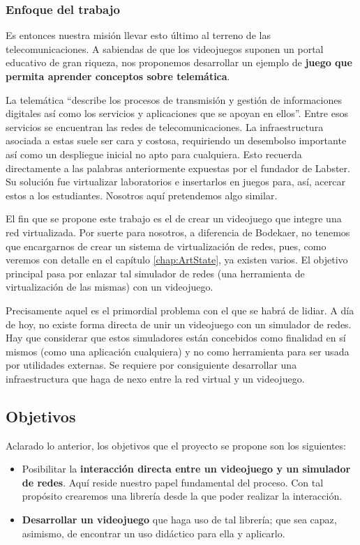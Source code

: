 \subsubsection{Enfoque del trabajo}
Es entonces nuestra misión llevar esto último al terreno de las telecomunicaciones. A sabiendas de que los videojuegos suponen un portal educativo de gran riqueza, nos proponemos desarrollar un ejemplo de \textbf{juego que permita aprender conceptos sobre telemática}.

La telemática ``describe los procesos de transmisión y gestión de informaciones digitales así como los servicios y aplicaciones que se apoyan en ellos''\cite{telematica}. Entre esos servicios se encuentran las redes de telecomunicaciones. La infraestructura asociada a estas suele ser cara y costosa, requiriendo un desembolso importante así como un despliegue inicial no apto para cualquiera. Esto recuerda directamente a las palabras anteriormente expuestas por el fundador de Labster. Su solución fue virtualizar laboratorios e insertarlos en juegos para, así, acercar estos a los estudiantes. Nosotros aquí pretendemos algo similar.

El fin que se propone este trabajo es el de crear un videojuego que integre una red virtualizada. Por suerte para nosotros, a diferencia de Bodekaer, no tenemos que encargarnos de crear un sistema de virtualización de redes, pues, como veremos con detalle en el capítulo \ref{chap:ArtState}, ya existen varios. El objetivo principal pasa por enlazar tal simulador de redes (una herramienta de virtualización de las mismas) con un videojuego.

Precisamente aquel es el primordial problema con el que se habrá de lidiar. A día de hoy, no existe forma directa de unir un videojuego con un simulador de redes. Hay que considerar que estos simuladores están concebidos como finalidad en sí mismos (como una aplicación cualquiera) y no como herramienta para ser usada por utilidades externas. Se requiere por consiguiente desarrollar una infraestructura que haga de nexo entre la red virtual y un videojuego.
 
\subsection{Objetivos}
Aclarado lo anterior, los objetivos que el proyecto se propone son los siguientes:
\begin{itemize}
\item Posibilitar la \textbf{interacción directa entre un videojuego y un simulador de redes}. Aquí reside nuestro papel fundamental del proceso. Con tal propósito crearemos una librería desde la que poder realizar la interacción.
\item \textbf{Desarrollar un videojuego} que haga uso de tal librería; que sea capaz, asimismo, de encontrar un uso didáctico para ella y aplicarlo.
\end{itemize}

